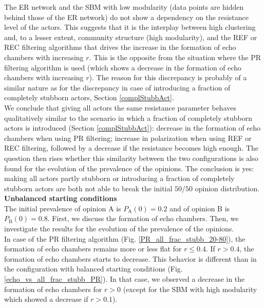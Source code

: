 \documentclass[11 pt , letterpaper , twoside , openright]{book}
\begin{document}
\newline
The ER network and the SBM with low modularity (data points are hidden behind those of the ER network) do not show a dependency on the resistance level of the actors. This suggests that it is the interplay between high clustering and, to a lesser extent, community structure (high modularity), and the REF or REC filtering algorithms that drives the increase in the formation of echo chambers with increasing $r$. This is the opposite from the situation where the PR filtering algorithm is used (which shows a decrease in the formation of echo chambers with increasing $r$). The reason for this discrepancy is probably of a similar nature as for the discrepancy in case of introducing a fraction of completely stubborn actors, Section \ref{complStubbAct}.\\
\newline
We conclude that giving all actors the same resistance parameter behaves qualitatively similar to the scenario in which a fraction of completely stubborn actors is introduced (Section \ref{complStubbAct}): decrease in the formation of echo chambers when using PR filtering; increase in polarization when using REF or REC filtering, followed by a decrease if the resistance becomes high enough. The question then rises whether this similarity between the two configurations is also found for the evolution of the prevalence of the opinions. The conclusion is yes: making all actors partly stubborn or introducing a fraction of completely stubborn actors are both not able to break the initial $50/50$ opinion distribution.\\
\newline
\textbf{Unbalanced starting conditions}\\
\newline
The initial prevalence of opinion A is $P_\text{A}(0) = 0.2$ and of opinion B is $P_\text{B}(0) = 0.8$. First, we discuss the formation of echo chambers. Then, we investigate the results for the evolution of the prevalence of the opinions.\\
\newline
In case of the PR filtering algorithm (Fig. \ref{PR_all_frac_stubb_20-80}), the formation of echo chambers remains more or less flat for $r \leqslant 0.4$. If $r > 0.4$, the formation of echo chambers starts to decrease. This behavior is different than in the configuration with balanced starting conditions (Fig. \ref{echo_vs_all_frac_stubb_PR}). In that case, we observed a decrease in the formation of echo chambers for $r > 0$ (except for the SBM with high modularity which showed a decrease if $r>0.1$).\\
\end{document}
